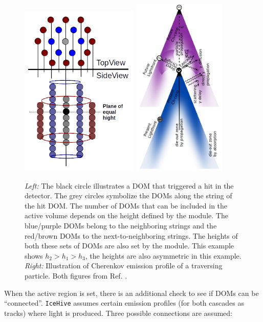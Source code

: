 \begin{figure}[t]
\centering
\includegraphics[width=0.5\textwidth]{chapter7/img/hexagons.png}
\includegraphics[width=0.4\textwidth]{chapter7/img/cherenkovzoll.png}
\caption{\textit{Left: }The black circle illustrates a DOM that triggered a hit in the detector. The grey circles symbolize the DOMs along the string of the hit DOM. The number of DOMs that can be included in the active volume depends on the height defined by the module. The blue/purple DOMs belong to the neighboring strings and the red/brown DOMs to the next-to-neighboring strings. The heights of both these sets of DOMs are also set by the module. This example shows $h_2 > h_1 > h_3$, the heights are also asymmetric in this example. \textit{Right: }Illustration of Cherenkov emission profile of a traversing particle. Both figures from Ref. \cite{mzollthesis}.}
\label{fig:hexagon}
\end{figure}
When the active region is set, there is an additional check to see if DOMs can be ``connected''. \texttt{IceHive} assumes certain emission profiles (for both cascades as tracks) where light is produced. Three possible connections are assumed:

